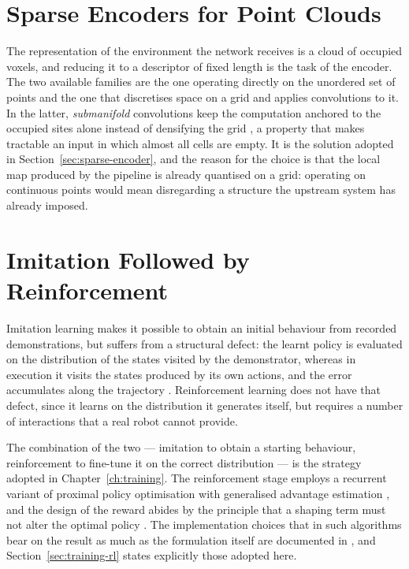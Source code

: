 \section{Sparse Encoders for Point Clouds}
\label{sec:rel-encoders}

The representation of the environment the network receives is a cloud of
occupied voxels, and reducing it to a descriptor of fixed length is the task of
the encoder. The two available families are the one operating directly on the
unordered set of points \cite{qi2017pointnet} and the one that discretises space
on a grid and applies convolutions to it. In the latter, \emph{submanifold}
convolutions keep the computation anchored to the occupied sites alone instead
of densifying the grid \cite{graham2018submanifold}, a property that makes
tractable an input in which almost all cells are empty. It is the solution
adopted in Section~\ref{sec:sparse-encoder}, and the reason for the choice is
that the local map produced by the pipeline is already quantised on a grid:
operating on continuous points would mean disregarding a structure the upstream
system has already imposed.

\section{Imitation Followed by Reinforcement}
\label{sec:rel-imitation-rl}

Imitation learning makes it possible to obtain an initial behaviour from
recorded demonstrations, but suffers from a structural defect: the learnt policy
is evaluated on the distribution of the states visited by the demonstrator,
whereas in execution it visits the states produced by its own actions, and the
error accumulates along the trajectory \cite{ross2011dagger}. Reinforcement
learning does not have that defect, since it learns on the distribution it
generates itself, but requires a number of interactions that a real robot cannot
provide.

The combination of the two --- imitation to obtain a starting behaviour,
reinforcement to fine-tune it on the correct distribution --- is the strategy
adopted in Chapter~\ref{ch:training}. The reinforcement stage employs a
recurrent variant of proximal policy optimisation \cite{schulman2017ppo} with
generalised advantage estimation \cite{schulman2016gae}, and the design of the
reward abides by the principle that a shaping term must not alter the optimal
policy \cite{ng1999policy}. The implementation choices that in such algorithms
bear on the result as much as the formulation itself are documented in
\cite{engstrom2020implementation}, and Section~\ref{sec:training-rl} states
explicitly those adopted here.

